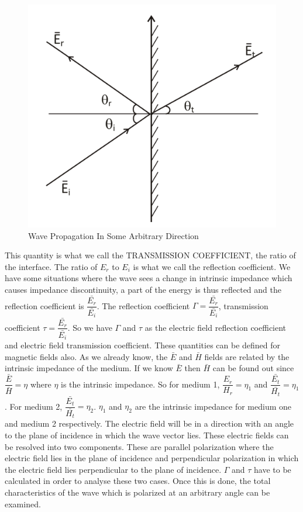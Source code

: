 \begin{figure}[h]
\centering
\includegraphics[width=.7\linewidth]{graphics/group30f}
\caption{Wave Propagation In Some Arbitrary Direction}
\label{fig:group30f}
\end{figure}

This quantity is what we call the TRANSMISSION COEFFICIENT, the ratio of the interface. The ratio of $ E_r$ to $E_i$ is what we call the reflection coefficient. We have some situations where the wave sees a change in intrinsic impedance which causes impedance discontinuity, a part of the energy is thus reflected and the reflection coefficient is $\dfrac{\bar{E_r}}{\bar{E_i}}$. The reflection coefficient $\Gamma=\dfrac{\bar{E_r}}{\bar{E_i}}$, transmission coefficient $\tau=\dfrac{\bar{E_r}}{\bar{E_i}}$. So we have $\Gamma$ and $\tau$ as the electric field reflection coefficient and electric field transmission coefficient. These quantities can be defined for magnetic fields also. As we already know, the $\bar{E}$ and $\bar{ H}$ fields are related by the intrinsic impedance of the medium. If we know $\bar{E}$ then $\bar{H}$ can be found out since $\dfrac{\bar{E}}{\bar{H}}=\eta$ where $\eta$ is the intrinsic impedance. So for medium 1,  $\dfrac{E_r}{H_r}=\eta_1$  and $\dfrac{\bar{E_t}}{\bar{H_t}}=\eta_1$. For medium 2, $\dfrac{\bar{E_t}}{\bar{H_t}}=\eta_2$. $\eta_1$ and $\eta_2$ are the intrinsic impedance for medium one and medium 2 respectively. The electric field will be in a direction with an angle to the plane of incidence in which the wave vector lies. These electric fields can be resolved into two components. These are parallel polarization where the electric field lies in the plane of incidence and perpendicular polarization in which the electric field lies perpendicular to the plane of incidence. $\Gamma$ and $\tau$ have to be calculated in order to analyse these two cases. Once this is done, the total characteristics of the wave which is polarized at an arbitrary angle can be examined.

